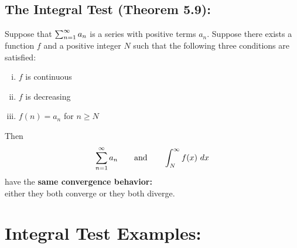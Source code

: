 \subsection*{The Integral Test (Theorem 5.9):}
Suppose that  \(\sum_{n=1}^\infty a_n\) is a series with positive terms \(a_n\). Suppose there exists a function \(f\) and a positive integer \(N\) such that the following three conditions are satisfied:
\begin{enumerate}[(i)]
\item \(f\) is continuous
\item \(f\) is decreasing
\item \(f(n) = a_n\) for \(n\geq N\)
\end{enumerate}
Then
\[
\sum_{n=1}^\infty a_n \qquad \text{and} \qquad \int_{N}^\infty f(x)\ dx
\]
have the \textbf{same convergence behavior:}\\ either they both converge or they both diverge.





\section*{Integral Test Examples:}

